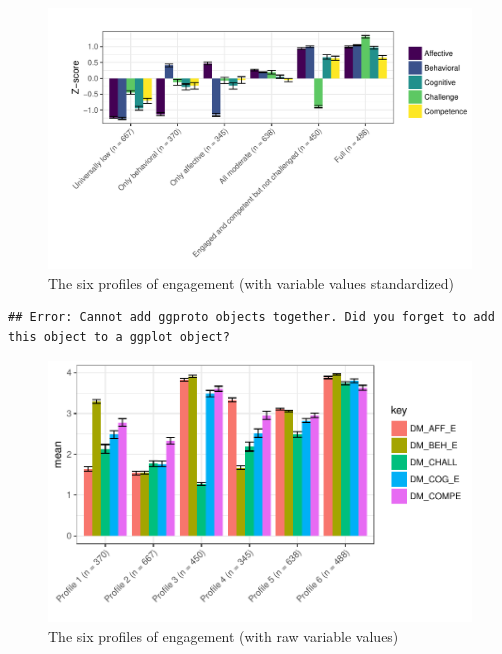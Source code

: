 \documentclass[]{msu-thesis}
\theoremstyle{definition}
\theoremstyle{definition}
\theoremstyle{definition}
\theoremstyle{remark}
\begin{document}
\begin{figure}

{\centering \includegraphics[width=1\linewidth]{rosenberg-dissertation_files/figure-latex/unnamed-chunk-11-1} 

}

\caption{The six profiles of engagement (with variable values standardized)}\label{fig:unnamed-chunk-11}
\end{figure}

\begin{verbatim}
## Error: Cannot add ggproto objects together. Did you forget to add this object to a ggplot object?
\end{verbatim}

\begin{figure}

{\centering \includegraphics[width=0.8\linewidth]{rosenberg-dissertation_files/figure-latex/unnamed-chunk-12-1} 

}

\caption{The six profiles of engagement (with raw variable values)}\label{fig:unnamed-chunk-12}
\end{figure}
\end{document}
